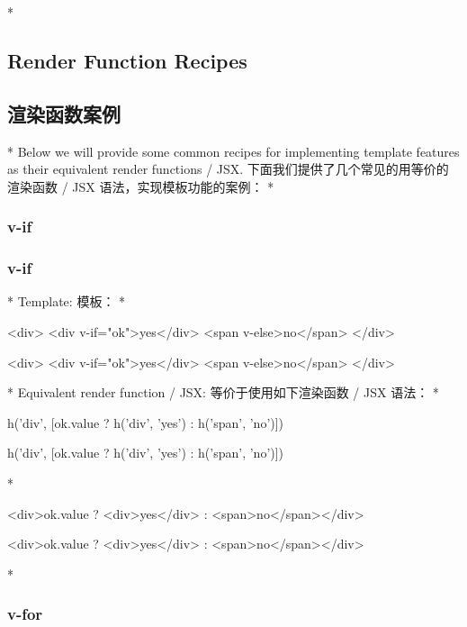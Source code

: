 \begin{paracol}{2} 
 
\switchcolumn[0]*%
\subsection{Render Function Recipes}
\switchcolumn
\subsection{渲染函数案例}
\switchcolumn[0]*%
Below we will provide some common recipes for implementing template
features as their equivalent render functions / JSX.
\switchcolumn
下面我们提供了几个常见的用等价的渲染函数 / JSX
语法，实现模板功能的案例：
\switchcolumn[0]*%
\subsubsection{v-if}
\switchcolumn
\subsubsection{v-if}
\switchcolumn[0]*%
Template:
\switchcolumn
模板：
\switchcolumn[0]*%
\begin{codeHtml}
<div>
  <div v-if="ok">yes</div>
  <span v-else>no</span>
</div>
\end{codeHtml}
\switchcolumn
\begin{codeHtml}
<div>
  <div v-if="ok">yes</div>
  <span v-else>no</span>
</div>
\end{codeHtml}
\switchcolumn[0]*%
Equivalent render function / JSX:
\switchcolumn
等价于使用如下渲染函数 / JSX 语法：
\switchcolumn[0]*%
\begin{codeJs}
h('div', [ok.value ? h('div', 'yes') : h('span', 'no')])
\end{codeJs}
\switchcolumn
\begin{codeJs}
h('div', [ok.value ? h('div', 'yes') : h('span', 'no')])
\end{codeJs}
\switchcolumn[0]*%
\begin{codeHtml}
<div>{ok.value ? <div>yes</div> : <span>no</span>}</div>
\end{codeHtml}
\switchcolumn
\begin{codeHtml}
<div>{ok.value ? <div>yes</div> : <span>no</span>}</div>
\end{codeHtml}
\switchcolumn[0]*%
\subsubsection{v-for}
\switchcolumn

\end{paracol}
